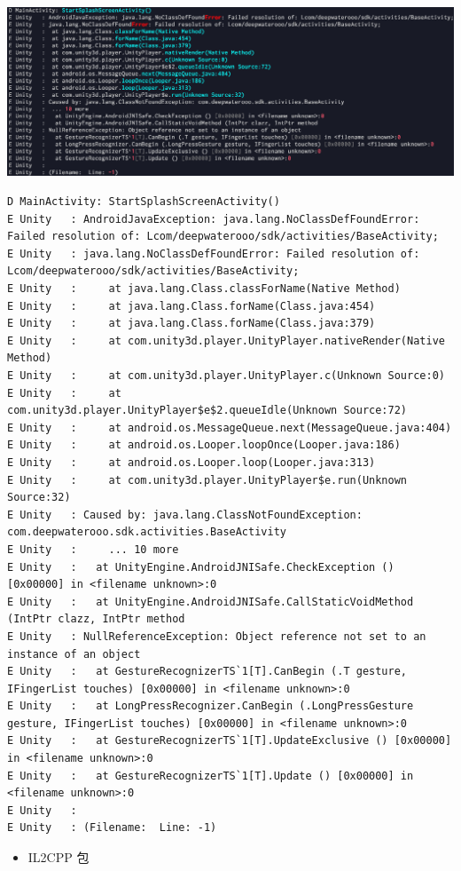 \documentclass[9pt, b5paper]{article}
\begin{document}
\includegraphics[width=.9\linewidth]{./pic/readme_20221220_151236.png}
\begin{verbatim}
D MainActivity: StartSplashScreenActivity() 
E Unity   : AndroidJavaException: java.lang.NoClassDefFoundError: Failed resolution of: Lcom/deepwaterooo/sdk/activities/BaseActivity;
E Unity   : java.lang.NoClassDefFoundError: Failed resolution of: Lcom/deepwaterooo/sdk/activities/BaseActivity;
E Unity   : 	at java.lang.Class.classForName(Native Method)
E Unity   : 	at java.lang.Class.forName(Class.java:454)
E Unity   : 	at java.lang.Class.forName(Class.java:379)
E Unity   : 	at com.unity3d.player.UnityPlayer.nativeRender(Native Method)
E Unity   : 	at com.unity3d.player.UnityPlayer.c(Unknown Source:0)
E Unity   : 	at com.unity3d.player.UnityPlayer$e$2.queueIdle(Unknown Source:72)
E Unity   : 	at android.os.MessageQueue.next(MessageQueue.java:404)
E Unity   : 	at android.os.Looper.loopOnce(Looper.java:186)
E Unity   : 	at android.os.Looper.loop(Looper.java:313)
E Unity   : 	at com.unity3d.player.UnityPlayer$e.run(Unknown Source:32)
E Unity   : Caused by: java.lang.ClassNotFoundException: com.deepwaterooo.sdk.activities.BaseActivity
E Unity   : 	... 10 more
E Unity   :   at UnityEngine.AndroidJNISafe.CheckException () [0x00000] in <filename unknown>:0 
E Unity   :   at UnityEngine.AndroidJNISafe.CallStaticVoidMethod (IntPtr clazz, IntPtr method
E Unity   : NullReferenceException: Object reference not set to an instance of an object
E Unity   :   at GestureRecognizerTS`1[T].CanBegin (.T gesture, IFingerList touches) [0x00000] in <filename unknown>:0 
E Unity   :   at LongPressRecognizer.CanBegin (.LongPressGesture gesture, IFingerList touches) [0x00000] in <filename unknown>:0 
E Unity   :   at GestureRecognizerTS`1[T].UpdateExclusive () [0x00000] in <filename unknown>:0 
E Unity   :   at GestureRecognizerTS`1[T].Update () [0x00000] in <filename unknown>:0 
E Unity   :  
E Unity   : (Filename:  Line: -1)
\end{verbatim}
\begin{itemize}
\item IL2CPP 包
\end{itemize}
\end{document}
